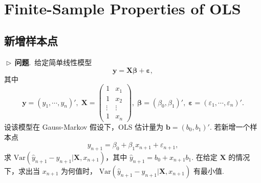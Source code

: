 \documentclass{article}
\newcommand{\Var}{\mathrm{Var}}
\newcommand{\y}{\mathbf{y}}
\newcommand{\X}{\mathbf{X}}
\newcommand{\0}{\mathbf{0}}
\newcommand{\vbe}{\bm{\beta}}
\newcommand{\vep}{\bm{\varepsilon}}
\newcommand{\vb}{\mathbf{b}}
\newcommand{\pro}{\noindent$\vartriangleright\,$\textbf{问题}.\ }
\begin{document}
\\ 

\section{Finite-Sample Properties of OLS}

\subsection{新增样本点}
\pro 给定简单线性模型
\[
\y = \X \vbe +\vep,
\]
其中 
\[
\y=(y_1,\cdots,y_n)',\;\X=
\begin{pmatrix}
1& x_1\\
1& x_2\\
\vdots&\vdots\\
1& x_n
\end{pmatrix},\;
\vbe=(\beta_0,\beta_1)',\;
\vep=(\varepsilon_1,\cdots,\varepsilon_n)'.
\]
设该模型在 Gauss-Markov 假设下，OLS 估计量为 $\vb=(b_0,b_1)'$. 若新增一个样本点
\[
y_{n+1}=\beta_0+\beta_1x_{n+1}+\varepsilon_{n+1},
\]
求 $\Var(\hat{y}_{n+1}-y_{n+1}|\X,x_{n+1})$，其中 $\hat{y}_{n+1}=b_0+x_{n+1}b_1$. 在给定 $\X$ 的情况下，求出当 $x_{n+1}$ 为何值时， $\Var(\hat{y}_{n+1}-y_{n+1}|\X,x_{n+1})$ 有最小值.\\
\end{document}
